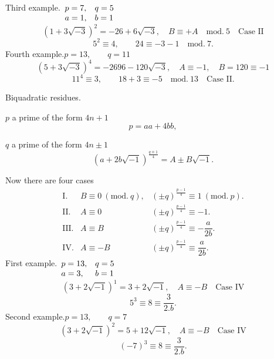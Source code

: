 \noindent{}\hspace*{\parindent}Third example.\qquad $\begin{array}[t]{ll}p=7,&q=5\\a=1,&b=1\end{array}$
\[(1+3\sqrt{-3})^2=-26+6\sqrt{-3},\quad B\equiv+A\quad\mathrm{mod.}\ 5\quad\text{Case II}\]
\[5^2\equiv4,\qquad24\equiv-3-1\quad\mathrm{mod.}\ 7.\]
\noindent\hspace*{\parindent}Fourth example.\qquad $p=13,\qquad q=11$
\[(5+3\sqrt{-3})^4=-2696-120\sqrt{-3},\quad A\equiv-1,\quad B=120\equiv-1\]
\[11^4\equiv3,\qquad18+3\equiv-5\quad\mathrm{mod.}\ 13\quad\text{Case II.}\]
\begin{center}Biquadratic residues.\end{center}
\noindent\hspace*{\parindent}$p$ a prime of the form $4n+1$
\[p=aa+4bb,\]
\par\noindent\hspace*{\parindent}$q$ a prime of the form $4n\pm1$
\[(a+2b\sqrt{-1})^{\frac{q\mp1}{4}}=A\pm B\sqrt{-1}.\]
\par\noindent\hspace*{\parindent}Now there are four cases
\[\begin{array}{rll}
\text{I.}&B\equiv0\ (\mathrm{mod.}\ q),&(\pm q)^{\frac{p-1}{4}}\equiv1\ (\mathrm{mod.}\ p).\\[4pt]
\text{II.}&A\equiv0&(\pm q)^{\frac{p-1}{4}}\equiv-1.\\[4pt]
\text{III.}&A\equiv B&(\pm q)^{\frac{p-1}{4}}\equiv-\dfrac{a}{2b}.\\[8pt]
\text{IV.}&A\equiv-B&(\pm q)^{\frac{p-1}{4}}\equiv\dfrac{a}{2b}.
\end{array}\]
\noindent\hspace*{\parindent}First example.\qquad $\begin{array}[t]{ll}p=13,&q=5\\a=3,&b=1\end{array}$
\[(3+2\sqrt{-1})^1=3+2\sqrt{-1},\quad A\equiv-B\quad\text{Case IV}\]
\[5^3\equiv8\equiv\dfrac{3}{2.b}.\]
\noindent\hspace*{\parindent}Second example.\qquad $p=13,\qquad q=7$
\[(3+2\sqrt{-1})^2=5+12\sqrt{-1},\quad A\equiv-B\quad\text{Case IV}\]
\[(-7)^3\equiv8\equiv\dfrac{3}{2.b}.\]

